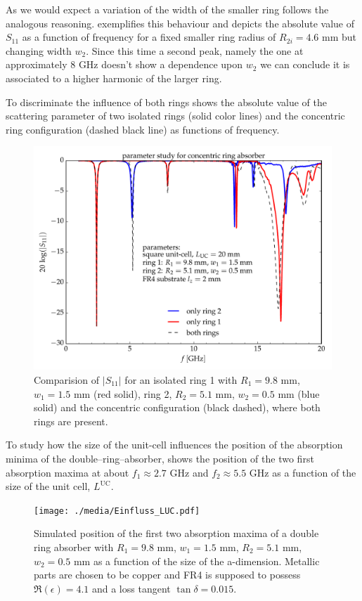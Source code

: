 As we would expect a variation of the width of the smaller ring follows the analogous reasoning.  exemplifies this behaviour and depicts the absolute value of $S_{11}$ as a function of frequency for a fixed smaller ring radius of $R_{2i}=4.6$ mm but changing width $w_2$. Since this time a second peak, namely the one at approximately 8 GHz doesn't show a dependence upon $w_2$ we can conclude it is associated to a higher harmonic of the larger ring. 

To discriminate the influence of both rings  shows the absolute value of the scattering parameter of two isolated rings (solid color lines) and the concentric ring configuration (dashed black line) as functions of frequency.

\begin{figure}
\centering
\includegraphics[width=0.75\linewidth]{./media/wifi_absorber_single_double_rings.pdf}
\caption{Comparision of $|S_{11}|$ for an isolated ring 1 with $R_1=9.8$ mm, $w_1=1.5$ mm (red solid), ring 2, $R_2=5.1$ mm, $w_2=0.5$ mm (blue solid) and the concentric configuration (black dashed), where both rings are present.}
\label{fig:single_double_rings}
\end{figure}

To study how the size of the unit-cell influences the position of the absorption 
minima of the double--ring--absorber,  shows the position of the two first absorption maxima at about $f_1\approx2.7$ GHz and $f_2\approx 5.5$ GHz as a function of the size of the unit cell, $L^\text{UC}$.
\begin{figure}
\centering
\texttt{[image: ./media/Einfluss\_LUC.pdf]}
\caption{Simulated position of the first two absorption maxima of a double ring absorber with $R_1=9.8$ mm, $w_1=1.5$ mm, $R_2=5.1$ mm, $w_2=0.5$ mm as a function of the size of the a-dimension. Metallic parts are chosen to be copper and FR4 is supposed to possess $\Re\left(\epsilon\right)=4.1$ and a loss tangent $\tan\delta = 0.015$.}
\label{fig:LUC}
\end{figure}

